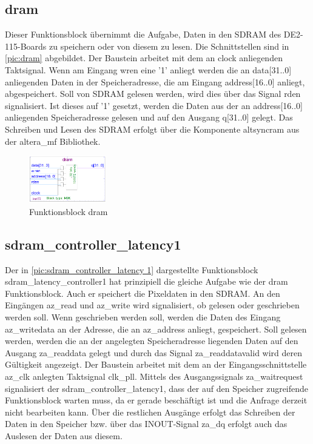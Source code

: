 \documentclass[ngerman,12pt]{article} %
\begin{document}
{\subsection{dram}
\label{sec:dram}
Dieser Funktionsblock übernimmt die Aufgabe, Daten in den SDRAM des DE2-115-Boards zu speichern oder von diesem zu lesen. Die Schnittstellen sind in \autoref{pic:dram} abgebildet. Der Baustein arbeitet mit dem an clock anliegenden Taktsignal. Wenn am Eingang wren eine '1' anliegt werden die an data[31..0] anliegenden Daten in der Speicheradresse, die am Eingang address[16..0] anliegt, abgespeichert. Soll von SDRAM gelesen werden, wird dies über das Signal rden signalisiert. Ist dieses auf '1' gesetzt, werden die Daten aus der an address[16..0] anliegenden Speicheradresse gelesen und auf den Ausgang q[31..0] gelegt. Das Schreiben und Lesen des SDRAM erfolgt über die Komponente altsyncram aus der altera\_mf Bibliothek.

\begin{figure}[htbp]
	\begin{center}
	\includegraphics[width = 0.3\textwidth]{dram}
	\caption [Funktionsblock dram]{\label{pic:dram}Funktionsblock dram}
	\end{center}
\end{figure}



\subsection{sdram\_controller\_latency1}
\label{sec:sdram_controller_latency1}
Der in \autoref{pic:sdram_controller_latency 1} dargestellte Funktionsblock sdram\_latency\_controller1 hat prinzipiell die gleiche Aufgabe wie der dram Funktionsblock. Auch er speichert die Pixeldaten in den SDRAM. An den Eingängen az\_read und az\_write wird signalisiert, ob gelesen oder geschrieben werden soll. Wenn geschrieben werden soll, werden die Daten des Eingang az\_writedata an der Adresse, die an az\_address anliegt, gespeichert. Soll gelesen werden, werden die an der angelegten Speicheradresse liegenden Daten auf den Ausgang za\_readdata gelegt und durch das Signal za\_readdatavalid wird deren Gültigkeit angezeigt. Der Baustein arbeitet mit dem an der Eingangsschnittstelle az\_clk  anlegten Taktsignal clk\_pll. Mittels des Ausgangssignals za\_waitrequest signalisiert der sdram\_controller\_latency1, dass der auf den Speicher zugreifende Funktionsblock warten muss, da er gerade beschäftigt ist und die Anfrage derzeit nicht bearbeiten kann. Über die restlichen Ausgänge erfolgt das Schreiben der Daten in den Speicher bzw. über das INOUT-Signal za\_dq erfolgt auch das Auslesen der Daten aus diesem.

}
\end{document}
